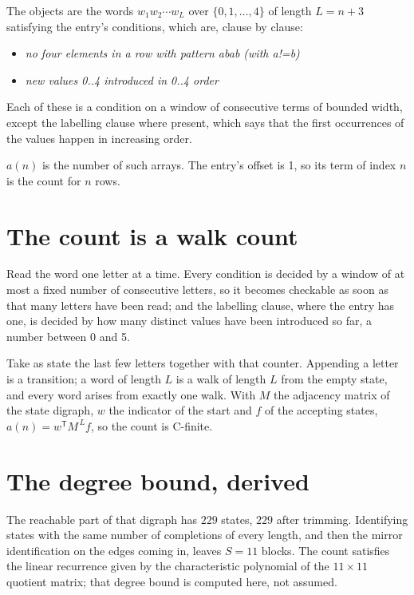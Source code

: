 \documentclass[11pt]{article}
\theoremstyle{definition}
\begin{document}
The objects are the words $w_1 w_2 \cdots w_L$ over $\{0,1,\dots,4\}$ of length $L = n + 3$ satisfying the entry's conditions, which are, clause by clause:

\begin{itemize}

\item {\itshape no four elements in a row with pattern abab (with a!=b)}

\item {\itshape new values 0..4 introduced in 0..4 order}

\end{itemize}

Each of these is a condition on a window of consecutive terms of bounded width, except the labelling clause where present, which says that the first occurrences of the values happen in increasing order.

$a(n)$ is the number of such arrays. The entry's offset is 1, so its term of index $n$ is the count for $n$ rows.

\section{The count is a walk count}

Read the word one letter at a time. Every condition is decided by a window of at most a fixed number of consecutive letters, so it becomes checkable as soon as that many letters have been read; and the labelling clause, where the entry has one, is decided by how many distinct values have been introduced so far, a number between $0$ and 5.

Take as state the last few letters together with that counter. Appending a letter is a transition; a word of length $L$ is a walk of length $L$ from the empty state, and every word arises from exactly one walk. With $M$ the adjacency matrix of the state digraph, $w$ the indicator of the start and $f$ of the accepting states, $a(n) = w^{\mathsf T}M^{\,L}f$, so the count is C-finite.

\section{The degree bound, derived}

The reachable part of that digraph has $229$ states, $229$ after trimming. Identifying states with the same number of completions of every length, and then the mirror identification on the edges coming in, leaves $S = 11$ blocks. The count satisfies the linear recurrence given by the characteristic polynomial of the $11\times11$ quotient matrix; that degree bound is computed here, not assumed.
\end{document}
